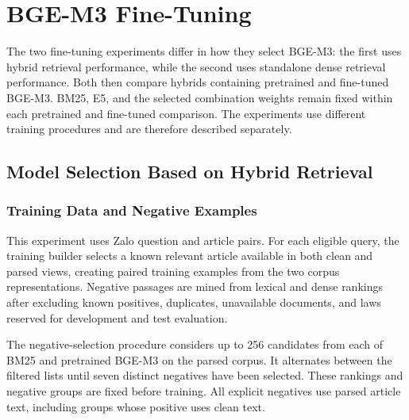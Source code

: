 \section{BGE-M3 Fine-Tuning}
\label{sec:bge-finetuning}

The two fine-tuning experiments differ in how they select BGE-M3: the first uses hybrid retrieval performance, while the second uses standalone dense retrieval performance. Both then compare hybrids containing pretrained and fine-tuned BGE-M3. BM25, E5, and the selected combination weights remain fixed within each pretrained and fine-tuned comparison. The experiments use different training procedures and are therefore described separately.

\subsection{Model Selection Based on Hybrid Retrieval}
\label{sec:finetuning-hybrid-selection}

\subsubsection{Training Data and Negative Examples}

This experiment uses Zalo question and article pairs. For each eligible query, the training builder selects a known relevant article available in both clean and parsed views, creating paired training examples from the two corpus representations. Negative passages are mined from lexical and dense rankings after excluding known positives, duplicates, unavailable documents, and laws reserved for development and test evaluation.

The negative-selection procedure considers up to 256 candidates from each of BM25 and pretrained BGE-M3 on the parsed corpus. It alternates between the filtered lists until seven distinct negatives have been selected. These rankings and negative groups are fixed before training. All explicit negatives use parsed article text, including groups whose positive uses clean text.

\begin{table}[H]
\centering
\footnotesize
{}
\setlength{\tabcolsep}{4pt}
\renewcommand{\arraystretch}{1.05}
\caption[Training groups and protected folds in the completed hybrid fine-tuning study.]{Training groups and protected folds in the completed hybrid fine-tuning study.}\label{tab:4.4}
\vspace{6pt}
\end{table}

